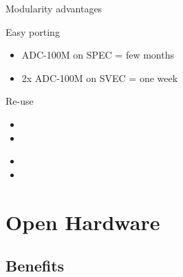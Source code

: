 \documentclass[compress,red]{beamer}
\begin{document}
\begin{frame}{Modularity advantages}

  \begin{block}{Easy porting}
    \begin{itemize}
    \item ADC-100M on SPEC = few months
    \item 2x ADC-100M on SVEC = one week
    \end{itemize}
  \end{block}

  \begin{block}{Re-use}
    \begin{itemize}
    \item 
    \item 
    \end{itemize}
  \end{block}

  \begin{block}{}
    \begin{itemize}
    \item 
    \item 
    \end{itemize}
  \end{block}

\end{frame}


\section{Open Hardware}

\subsection{Benefits}
\end{document}
